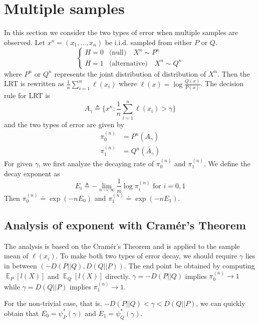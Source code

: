 \documentclass{article}
\DeclareMathOperator{\E}{\mathbb{E}}
\begin{document}
\section{Multiple samples}
In this section we consider the two types of error
when multiple samples are observed.
Let $x^n = (x_1, \dots, x_n)$ be i.i.d. sampled from either
$P$ or $Q$.
\begin{equation}
    \begin{cases}
    H=0 & \textrm{(null)} \quad X^n \sim P^n \\
    H=1 & \textrm{(alternative)} \quad X^n \sim Q^n
    \end{cases}
\end{equation}
where $P^n$ or $Q^n$ represents the joint distribution of distribution of $X^n$. Then the LRT is rewritten
as $\frac{1}{n}\sum_{i=1}^n \ell(x_i)$ where
$\ell(x)=\log \frac{Q(x)}{P(x)}$. The decision rule for LRT
is
\begin{equation}\label{eq:AgammaN}
    A_{\gamma} \triangleq \{
x^n: \frac{1}{n}\sum_{i=1}^n \ell(x_i) > \gamma
\}
\end{equation}
and the two types of error are given by
\begin{align*}
    \pi_0^{(n)} &= P^n(A_{\gamma}) \\
    \pi_1^{(n)} &= Q^n(\bar{A}_{\gamma})
\end{align*}
For given $\gamma$, we first analyze the decaying
rate of $\pi_0^{(n)}$ and $\pi_1^{(n)}$.
We define the decay exponent as
\begin{equation}
    E_i \triangleq -\lim_{n\to \infty} \frac{1}{n}
    \log \pi_i^{(n)}\textrm{ for } i=0,1
\end{equation}
Then $\pi_0^{(n)} \doteq \exp(-n E_0)$
and $\pi_1^{(n)} \doteq \exp(-n E_1)$.
\subsection{Analysis of exponent with Cramér's Theorem}
The analysis is based on the Cramér's Theorem
and is applied to the sample mean of $\ell(x_i)$.
To make both two types of error decay, we should require
$\gamma$ lies in between $(-D(P||Q), D(Q||P))$. The end point
be obtained by computing $\E_P[l(X)]$ and $\E_Q[l(X)]$ directly. $\gamma = -D(P||Q)$ implies $\pi_0^{(n)}\to 1$
while $\gamma = D(Q||P)$ implies $\pi_1^{(n)}\to 1$.

For the non-trivial case, that is, $-D(P||Q) < \gamma < D(Q||P)$, we can quickly obtain that
$E_0 = \psi^*_P(\gamma)$ and $E_1 = \psi^*_Q(\gamma)$.
\end{document}
